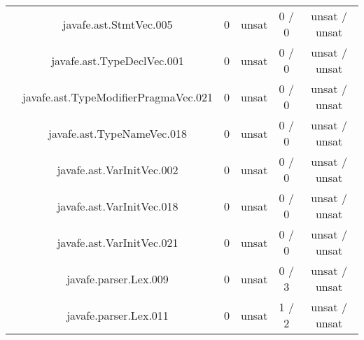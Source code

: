 \begin{table}[htbp]
\begin{minipage}{0.60\textwidth}
{\begin{tabular}[c]{c c!{\vrule width 1.5pt}c|c!{\vrule width 1.5pt}c|c|}
 			& javafe.ast.StmtVec.005		  		      & 0    & unsat   & 0  / 0    & unsat / unsat  \\
		 	& javafe.ast.TypeDeclVec.001	    			      & 0    & unsat   & 0  / 0    & unsat / unsat  \\
		 	& javafe.ast.TypeModifierPragmaVec.021 			      & 0    & unsat   & 0  / 0    & unsat / unsat  \\
 			& javafe.ast.TypeNameVec.018				      & 0    & unsat   & 0  / 0    & unsat / unsat  \\
 			& javafe.ast.VarInitVec.002		   		      & 0    & unsat   & 0  / 0    & unsat / unsat  \\
 			& javafe.ast.VarInitVec.018		   		      & 0    & unsat   & 0  / 0    & unsat / unsat  \\
		 	& javafe.ast.VarInitVec.021	    			      & 0    & unsat   & 0  / 0    & unsat / unsat  \\
		 	& javafe.parser.Lex.009		    			      & 0    & unsat   & 0  / 3    & unsat / unsat  \\
		 	& javafe.parser.Lex.011		    			      & 0    & unsat   & 1  / 2    & unsat / unsat  \\

\end{tabular}}
\end{minipage}
\end{table}
